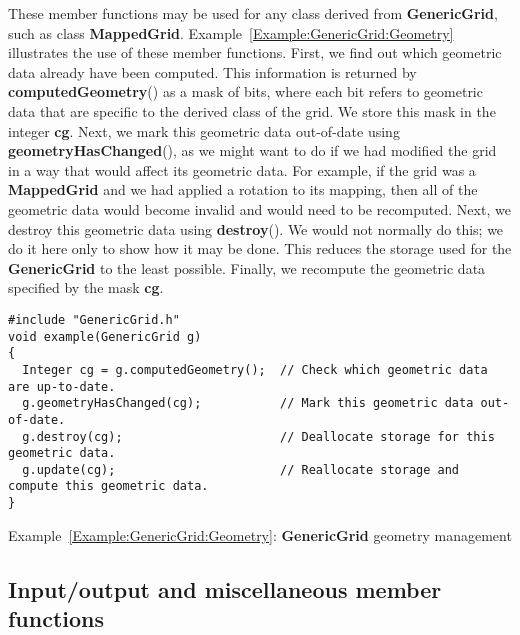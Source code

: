 \documentclass{article}
\begin{document}
These member
functions may be used for any class derived from \textbf{GenericGrid},
such as class \textbf{MappedGrid}.
Example~\ref{Example:GenericGrid:Geometry}
illustrates the use of these member functions.  First, we find out which
geometric data already have been computed.  This information is returned
by \textbf{computedGeometry}() as a mask of bits, where each bit refers
to geometric data that are specific to the derived class of the
grid.  We store this mask in the integer \textbf{cg}.  Next, we mark
this geometric data out-of-date using \textbf{geometryHasChanged}(),
as we might want to do if we had modified the grid in a way that would
affect its geometric data.  For example, if the grid was a
\textbf{MappedGrid} and we had applied a rotation to its mapping, then
all of the geometric data would become invalid and would need to be
recomputed.  Next, we destroy this geometric data using
\textbf{destroy}().  We would not normally do this; we do it here only
to show how it may be done. This reduces the storage used for the
\textbf{GenericGrid} to the least possible.  Finally, we recompute the
geometric data specified by the mask \textbf{cg}.

{\small
\begin{verbatim}
#include "GenericGrid.h"
void example(GenericGrid g) 
{
  Integer cg = g.computedGeometry();  // Check which geometric data are up-to-date.          
  g.geometryHasChanged(cg);           // Mark this geometric data out-of-date.               
  g.destroy(cg);                      // Deallocate storage for this geometric data.         
  g.update(cg);                       // Reallocate storage and compute this geometric data. 
} 
\end{verbatim}
}
{\center Example~\ref{Example:GenericGrid:Geometry}: \textbf{GenericGrid} geometry management\label{Example:GenericGrid:Geometry}}

\subsection{Input/output and miscellaneous member functions}
\label{GenericGrid:Miscellaneous}
\end{document}
